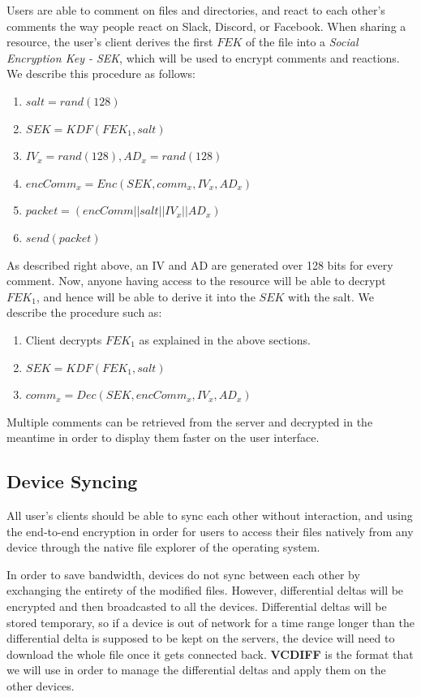 \documentclass[a4paper,9pt,twoside]{article}
\begin{document}
Users are able to comment on files and directories, and react to each other's comments the 
way people react on Slack, Discord, or Facebook. When sharing a resource, the user's client derives the first $FEK$ of the file into 
a \emph{Social Encryption Key - SEK}, which will be used to encrypt comments and 
reactions. We describe this procedure as follows:

\begin{enumerate}
\itemsep0em
\item $salt=rand(128)$
\item $SEK=KDF(FEK_1, salt)$
\item $IV_x=rand(128), AD_x=rand(128)$
\item $encComm_x=Enc(SEK, comm_x, IV_x, AD_x)$
\item $packet=(encComm||salt||IV_x||AD_x)$
\item $send(packet)$
\end{enumerate}

As described right above, an IV and AD are generated over 128 bits 
for every comment. Now, anyone having access to the resource will be able to 
decrypt $FEK_1$, and hence will be able to derive it into the $SEK$ with 
the salt. We describe the procedure such as:

\begin{enumerate}
\itemsep0em
\item Client decrypts $FEK_1$ as explained in the above sections.
\item $SEK=KDF(FEK_1, salt)$
\item $comm_x=Dec(SEK, encComm_x, IV_x, AD_x)$
\end{enumerate}

Multiple comments can be retrieved from the server and decrypted in the meantime 
in order to display them faster on the user interface.

\subsection{Device Syncing}

All user's clients should be able to sync each other without interaction, and 
using the end-to-end encryption in order for users to access their files 
natively from any device through the native file explorer of the operating system.

In order to save bandwidth, devices do not sync between each other by exchanging 
the entirety of the modified files. However, differential deltas will be encrypted 
and then broadcasted to all the devices. Differential deltas will be stored temporary, 
so if a device is out of network for a time range longer than the differential delta 
is supposed to be kept on the servers, the device will need to download the whole 
file once it gets connected back. \textbf{VCDIFF} is the format that we will use in order 
to manage the differential deltas and apply them on the other devices.
\end{document}
